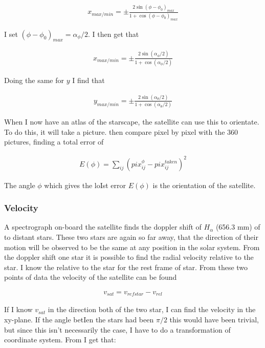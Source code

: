 \documentclass[a4paper, 10pt]{article}
\begin{document}
\begin{align}
x_{max/min} = \pm \frac{2 \sin(\phi - \phi_0)_{max}}{1+\cos (\phi - \phi_0)_{max}}
\end{align}

I set $(\phi - \phi_0)_{max} = \alpha_{\phi}/2$. I then get that

\begin{align}
x_{max/min} = \pm \frac{2 \sin(\alpha_{\phi}/2)}{1+\cos (\alpha_{\phi}/2)}
\end{align}

Doing the same for $y$ I find that 

\begin{align}
y_{max/min} = \pm \frac{2 \sin(\alpha_{\theta}/2)}{1+\cos (\alpha_{\theta}/2)}
\end{align}


When I now have an atlas of the starscape, the satellite can use this to orientate. To do this, it will take a picture. then compare pixel by pixel with the 360 pictures, finding a total error of
 
\begin{align}
E(\phi) = \sum_{ij}(pix_{ij}^{\phi} - pix_{ij}^{taken})^2
\end{align}

The angle $\phi$ which gives the loIst error $E(\phi)$ is the orientation of the satellite.

\subsubsection{Velocity}
A spectrograph on-board the satellite finds the doppler shift of $H_{\alpha}$ (656.3 mm) of to distant stars. These two stars are again so far away, that the direction of their motion will be observed to be the same at any position in the solar system. From the doppler shift one star it is possible to find the radial velocity relative to the star. I know the  relative to the star for the rest frame of star. From these two points of data the velocity of the satellite can be found

\begin{align}
v_{sat} = v_{refstar} - v_{rel}
\end{align}

If I know $v_{sat}$ in the direction both of the two star, I can find the velocity in the xy-plane. If the angle betIen the stars had been $\pi/2$ this would have been trivial, but since this isn't necessarily the case, I have to do a transformation of coordinate system. From \cite{part4} I get that:
\end{document}

